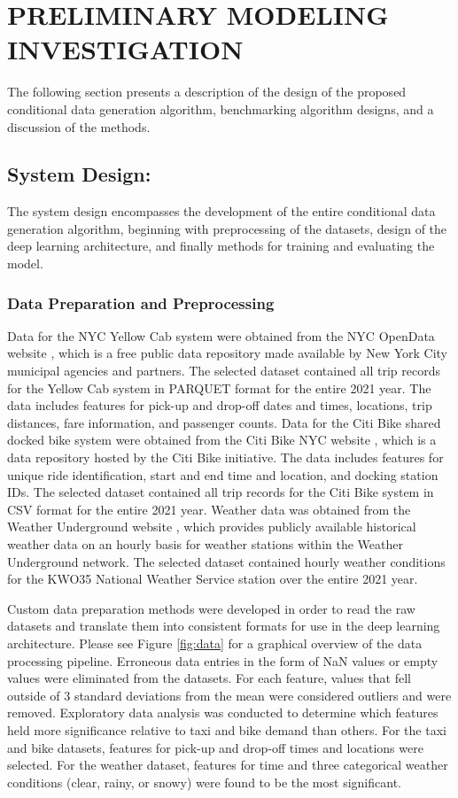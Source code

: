 \documentclass[conference]{IEEEtran}
\begin{document}
\section{PRELIMINARY MODELING INVESTIGATION}
The following section presents a description of the design of the proposed conditional data generation algorithm,
 benchmarking algorithm designs, and a discussion of the methods.
\subsection{System Design:}
The system design encompasses the development of the entire conditional data generation algorithm, beginning with preprocessing 
of the datasets, design of the deep learning architecture, and finally methods for training and evaluating the model.
\subsubsection{Data Preparation and Preprocessing}

Data for the NYC Yellow Cab system were obtained from the NYC OpenData website \cite{noauthor_nyc_nodate}, which is a free public
 data repository made available by New York City municipal agencies and partners. The selected dataset contained all trip records
  for the Yellow Cab system in PARQUET format for the entire 2021 year. The data includes features for pick-up and drop-off dates
   and times, locations, trip distances, fare information, and passenger counts. Data for the Citi Bike shared docked bike system
    were obtained from the Citi Bike NYC website \cite{noauthor_citi_nodate}, which is a data repository hosted by the Citi Bike 
    initiative. The data includes features for unique ride identification, start and end time and location, and docking station 
    IDs. The selected dataset contained all trip records for the Citi Bike system in CSV format for the entire 2021 year. Weather
     data was obtained from the Weather Underground website \cite{noauthor_weather_nodate}, which provides publicly available 
     historical weather data on an hourly basis for weather stations within the Weather Underground network. The selected dataset
      contained hourly weather conditions for the KWO35 National Weather Service station over the entire 2021 year. 

Custom data preparation methods were developed in order to read the raw datasets and translate them into consistent formats for 
use in the deep learning architecture. Please see Figure \ref{fig:data} for a graphical overview of the data processing pipeline. 
Erroneous data entries in the form of NaN values or empty values were eliminated from the 
datasets. For each feature, values that fell outside of 3 standard deviations from the mean were considered outliers and were 
removed. Exploratory data analysis was conducted to determine which features held more significance relative to taxi and bike 
demand than others. For the taxi and bike datasets, features for pick-up and drop-off times and locations were selected. For the 
weather dataset, features for time and three categorical weather conditions (clear, rainy, or snowy) 
 were found to be the most significant. 
\end{document}
